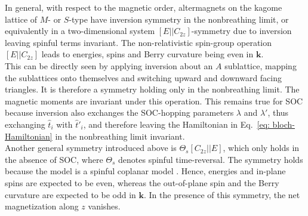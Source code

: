 In general, with respect to the magnetic order, altermagnets on the kagome lattice of $M$- or $S$-type have inversion symmetry in the nonbreathing limit, or equivalently in a two-dimensional system $[E||C_{2z}]$-symmetry due to inversion leaving spinful terms invariant. The non-relativistic spin-group operation $[E||C_{2z}]$ leads to energies, spins and Berry curvature being even in $\mathbf{k}$. \\
This can be directly seen by applying inversion about an $A$ sublattice, mapping the sublattices onto themselves and switching upward and downward facing triangles. It is therefore a symmetry holding only in the nonbreathing limit. The magnetic moments are invariant under this operation.
This remains true for SOC because inversion also exchanges the SOC-hopping parameters $\lambda$ and $\lambda'$, thus exchanging $\hat{t}_i$ with $\hat{t}'_i$, and therefore leaving the Hamiltonian in Eq.~\eqref{eq: bloch-Hamiltonian} in the nonbreathing limit invariant.\\

Another general symmetry introduced above is $\Theta_s[C_{2z}||E]$, which only holds in the absence of SOC, where $\Theta_s$ denotes spinful time-reversal. The symmetry holds because the model is  a spinful coplanar model . Hence, energies and in-plane spins are expected to be even, whereas the out-of-plane spin and the Berry curvature are expected to be odd in $\mathbf{k}$. In the presence of this symmetry, the net magnetization along $z$ vanishes. 



